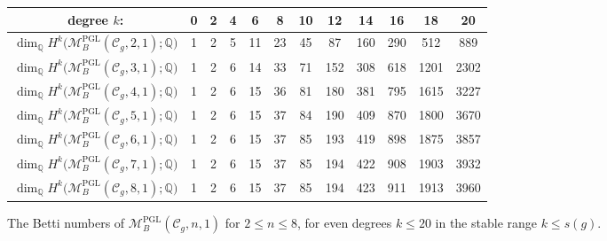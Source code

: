 \documentclass[11pt,reqno]{amsart}
\theoremstyle{plain} %
\theoremstyle{definition}
\newcommand{\QQ}{\mathbb{Q}}
\newcommand{\M}{\mathcal{M}}
\newcommand{\C}{\mathcal{C}}
\DeclareMathOperator{\PGL}{PGL}
\begin{document}
\begin{figure}[ht!]
\renewcommand{\arraystretch}{1.35}
\setlength{\tabcolsep}{5pt}
	\begin{tabular}{|c|c|c|c|c|c|c|c|c|c|c|c|}
		\hline
		degree $k$: & 0 & 2 & 4 & 6 & 8 & 10 & 12 & 14 & 16 & 18 & 20 \\
		\hline
		$\dim_\QQ H^{k}\big(\M_B^{\PGL}(\C_g,2,1); \QQ\big)$ & 1 & 2 & 5 & 11 & 23 & 45 & 87 & 160 & 290 & 512 & 889 \\
		$\dim_\QQ H^{k}\big(\M_B^{\PGL}(\C_g,3,1); \QQ\big)$ & 1 & 2 & 6 & 14 & 33 & 71 & 152 & 308 & 618 & 1201 & 2302 \\
		$\dim_\QQ H^{k}\big(\M_B^{\PGL}(\C_g,4,1); \QQ\big)$ & 1 & 2 & 6 & 15 & 36 & 81 & 180 & 381 & 795 & 1615 & 3227 \\
		$\dim_\QQ H^{k}\big(\M_B^{\PGL}(\C_g,5,1); \QQ\big)$ & 1 & 2 & 6 & 15 & 37 & 84 & 190 & 409 & 870 & 1800 & 3670 \\
		$\dim_\QQ H^{k}\big(\M_B^{\PGL}(\C_g,6,1); \QQ\big)$ & 1 & 2 & 6 & 15 & 37 & 85 & 193 & 419 & 898 & 1875 & 3857 \\
		$\dim_\QQ H^{k}\big(\M_B^{\PGL}(\C_g,7,1); \QQ\big)$ & 1 & 2 & 6 & 15 & 37 & 85 & 194 & 422 & 908 & 1903 & 3932 \\
		$\dim_\QQ H^{k}\big(\M_B^{\PGL}(\C_g,8,1); \QQ\big)$ & 1 & 2 & 6 & 15 & 37 & 85 & 194 & 423 & 911 & 1913 & 3960 \\
		\hline
	\end{tabular}
	\caption{The Betti numbers of $\M_B^{\PGL}(\C_g,n,1)$ for $2 \leq n \leq 8$, for even degrees $k \leq 20$ in the stable range $k \leq s(g)$.}
	\label{fig:table-pgl}
\end{figure}
\end{document}
